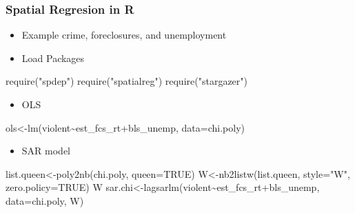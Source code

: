 \documentclass[
  shownotes,
  xcolor={svgnames},
  hyperref={colorlinks,citecolor=DarkBlue,linkcolor=DarkRed,urlcolor=DarkBlue}
   , aspectratio=169]{beamer}
\newenvironment{Shaded}{\begin{snugshade}}{\end{snugshade}}
\newcommand{\AttributeTok}[1]{\textcolor[rgb]{0.77,0.63,0.00}{#1}}
\newcommand{\ConstantTok}[1]{\textcolor[rgb]{0.00,0.00,0.00}{#1}}
\newcommand{\FunctionTok}[1]{\textcolor[rgb]{0.00,0.00,0.00}{#1}}
\newcommand{\NormalTok}[1]{#1}
\newcommand{\OtherTok}[1]{\textcolor[rgb]{0.56,0.35,0.01}{#1}}
\newcommand{\SpecialCharTok}[1]{\textcolor[rgb]{0.00,0.00,0.00}{#1}}
\newcommand{\StringTok}[1]{\textcolor[rgb]{0.31,0.60,0.02}{#1}}
\begin{document}
\begin{frame}[fragile]
\frametitle{Spatial Regresion in R}

\footnotesize
\begin{itemize}
    \item Example crime, foreclosures, and unemployment
    \item Load Packages
\end{itemize}
\begin{tiny}
\begin{Shaded}
\begin{Highlighting}[]
\FunctionTok{require}\NormalTok{(}\StringTok{"spdep"}\NormalTok{)}
\FunctionTok{require}\NormalTok{(}\StringTok{"spatialreg"}\NormalTok{)}
\FunctionTok{require}\NormalTok{(}\StringTok{"stargazer"}\NormalTok{)}
\end{Highlighting}
\end{Shaded}
\end{tiny}

\begin{itemize}
    \item OLS
\end{itemize}

\begin{Shaded}
\begin{tiny}
\begin{Highlighting}[]
\NormalTok{ols}\OtherTok{\textless{}{-}}\FunctionTok{lm}\NormalTok{(violent}\SpecialCharTok{\textasciitilde{}}\NormalTok{est\_fcs\_rt}\SpecialCharTok{+}\NormalTok{bls\_unemp, }\AttributeTok{data=}\NormalTok{chi.poly)}
\end{Highlighting}
\end{tiny}
\end{Shaded}



\begin{itemize}
    \item SAR model
\end{itemize}

\begin{Shaded}
\begin{tiny}
\begin{Highlighting}[]
\NormalTok{list.queen}\OtherTok{\textless{}{-}}\FunctionTok{poly2nb}\NormalTok{(chi.poly, }\AttributeTok{queen=}\ConstantTok{TRUE}\NormalTok{)}
\NormalTok{W}\OtherTok{\textless{}{-}}\FunctionTok{nb2listw}\NormalTok{(list.queen, }\AttributeTok{style=}\StringTok{"W"}\NormalTok{, }\AttributeTok{zero.policy=}\ConstantTok{TRUE}\NormalTok{)}
\NormalTok{W}
\NormalTok{sar.chi}\OtherTok{\textless{}{-}}\FunctionTok{lagsarlm}\NormalTok{(violent}\SpecialCharTok{\textasciitilde{}}\NormalTok{est\_fcs\_rt}\SpecialCharTok{+}\NormalTok{bls\_unemp, }\AttributeTok{data=}\NormalTok{chi.poly, W)}
\end{Highlighting}
\end{tiny}
\end{Shaded}

\end{frame}
\end{document}
